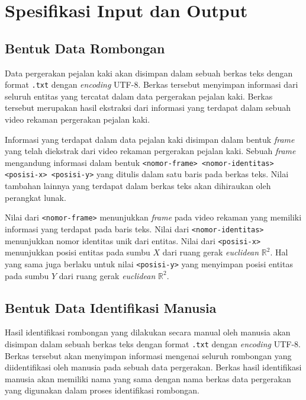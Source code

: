 \section{Spesifikasi Input dan Output}
\label{sec:input-output}

\subsection{Bentuk Data Rombongan}
\label{sec:input}

Data pergerakan pejalan kaki akan disimpan dalam sebuah berkas teks dengan format \texttt{.txt} dengan \textit{encoding} UTF-8. Berkas tersebut menyimpan informasi dari seluruh entitas yang tercatat dalam data pergerakan pejalan kaki. Berkas tersebut merupakan hasil ekstraksi dari informasi yang terdapat dalam sebuah video rekaman pergerakan pejalan kaki.

Informasi yang terdapat dalam data pejalan kaki disimpan dalam bentuk \textit{frame} yang telah diekstrak dari video rekaman pergerakan pejalan kaki. Sebuah \textit{frame} mengandung informasi dalam bentuk \texttt{<nomor-frame> <nomor-identitas> <posisi-x> <posisi-y>} yang ditulis dalam satu baris pada berkas teks. Nilai tambahan lainnya yang terdapat dalam berkas teks akan dihiraukan oleh perangkat lunak.

Nilai dari \texttt{<nomor-frame>} menunjukkan \textit{frame} pada video rekaman yang memiliki informasi yang terdapat pada baris teks. Nilai dari \texttt{<nomor-identitas>} menunjukkan nomor identitas unik dari entitas. Nilai dari \texttt{<posisi-x>} menunjukkan posisi entitas pada sumbu $X$ dari ruang gerak \textit{euclidean} $\mathbb{R}^2$. Hal yang sama juga berlaku untuk nilai \texttt{<posisi-y>} yang menyimpan posisi entitas pada sumbu $Y$ dari ruang gerak \textit{euclidean} $\mathbb{R}^2$.

\subsection{Bentuk Data Identifikasi Manusia}
\label{sec:human-identification}

Hasil identifikasi rombongan yang dilakukan secara manual oleh manusia akan disimpan dalam sebuah berkas teks dengan format \texttt{.txt} dengan \textit{encoding} UTF-8. Berkas tersebut akan menyimpan informasi mengenai seluruh rombongan yang diidentifikasi oleh manusia pada sebuah data pergerakan. Berkas hasil identifikasi manusia akan memiliki nama yang sama dengan nama berkas data pergerakan yang digunakan dalam proses identifikasi rombongan. 

